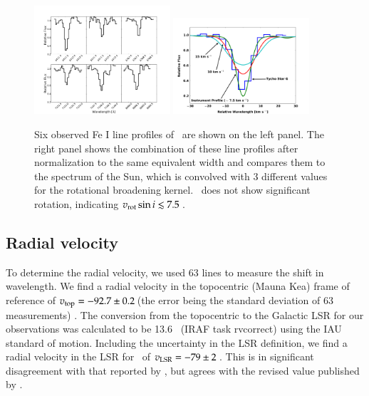 \begin{figure}[h!]
\centering
\includegraphics*[width=0.45\textwidth]{chapter_sn1572_starg/plots/precombobj_sn1572.pdf}
\includegraphics*[width=0.45\textwidth]{chapter_sn1572_starg/plots/rotcomp_subaru_starg.pdf}
\caption{Six observed Fe I line profiles of  \starg\ are shown on the left panel. The right panel shows the combination of these line profiles after normalization to the same equivalent width and compares them to the spectrum of the Sun, which is convolved with 3 different values for the rotational broadening kernel. \starg\ does not show significant rotation, indicating $v_{\rm{rot}} \sin{i} \lesssim 7.5$\,\kms.}
\label{fig:sunobjrot}
\end{figure}

\subsection{Radial velocity}

To determine the radial velocity, we used 63 lines to measure the shift
in wavelength. We find a radial velocity in the topocentric (Mauna
Kea) frame of reference of $v_{\rm top} = - 92.7 \pm 0.2$\,\kms (the
error being the standard deviation of 63 measurements) . The
conversion from the topocentric to the Galactic LSR for our
observations was calculated to be 13.6 \kms\ (IRAF task rvcorrect)
using the IAU standard of motion. Including the uncertainty in the LSR
definition, we find a radial velocity in the LSR for \starg\ of
$v_{\rm LSR} = -79 \pm 2$\,\kms. This is in significant disagreement
with that reported by \rl, but agrees with the revised value published by \gh.


